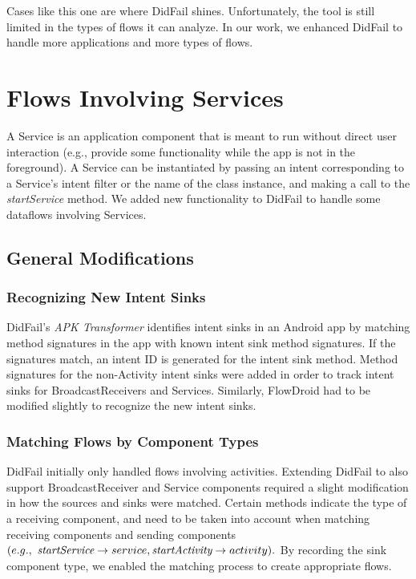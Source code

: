 Cases like this one are where DidFail shines. 
Unfortunately, the tool is still limited in the types of flows it can analyze. In our work, we enhanced DidFail to handle more applications and more types of flows.

\chapter{Flows Involving Services} \label{chap:services}
A Service is an application component that is meant to run without direct user interaction (e.g., provide some functionality while the app is not in the foreground). A Service can be instantiated by passing an intent corresponding to a Service's intent filter or the name of the class instance, and making a call to the \emph{startService} method. We added new functionality to DidFail to handle some dataflows involving Services.  

\section{General Modifications}
\subsection{Recognizing New Intent Sinks}
DidFail's \emph{APK Transformer} identifies intent sinks in an Android app by matching method signatures in the app with known intent sink method signatures. If the signatures match, an intent ID is generated for the intent sink method. Method signatures for the non-Activity intent sinks were added in order to track intent sinks for BroadcastReceivers and Services. Similarly, FlowDroid had to be modified slightly to recognize the new intent sinks. 

\subsection{Matching Flows by Component Types}
DidFail initially only handled flows involving activities. Extending DidFail to also support BroadcastReceiver and Service components required a slight modification in how the sources and sinks were matched. Certain methods indicate the type of a receiving component, and need to be taken into account when matching receiving components and sending components $(e.g.,\  \emph{startService} \rightarrow service, \emph{startActivity} \rightarrow activity).$ By recording the sink component type, we enabled the matching process to create appropriate flows.

